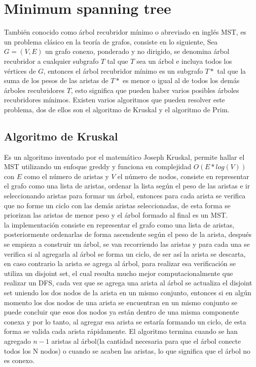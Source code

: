 \documentclass[12pt, a4paper]{article}
\newcommand\cppfile[2][]{

}
\begin{document}
	\section{Minimum spanning tree}
	\label{grafos:MST}
	
	También conocido como árbol recubridor mínimo o abreviado en inglés MST, es un problema clásico en la teoría de 
	grafos, consiste en lo siguiente, Sea $G = (V, E)$ un grafo conexo, ponderado y no dirigido, se denomina árbol 
	recubridor a cualquier subgrafo $T$ tal que $T$ sea un árbol e incluya todos los vértices de $G$, entonces el 
	árbol recubridor mínimo es un subgrafo $T*$ tal que la suma de los pesos de las aristas de $T*$ es menor o igual 
	al de todos los demás árboles recubridores $T$, esto significa que pueden haber varios posibles árboles 
	recubridores mínimos. Existen varios algoritmos que pueden resolver este problema, dos de ellos son el algoritmo 
	de Kruskal y el algoritmo de Prim.
	
	\subsection{Algoritmo de Kruskal}
	\label{grafos:MST:kruskal}
	
	Es un algoritmo inventado por el matemático Joseph Kruskal, permite hallar el MST utilizando un enfoque greddy y 
	funciona en complejidad $O(E*log(V))$ con $E$ como el número de aristas y $V$ el número de nodos, consiste en 
	representar el grafo como una lista de aristas, ordenar la lista según el peso de las aristas e ir seleccionando 
	aristas para formar un árbol, entonces para cada arista se verifica que no forme un ciclo con las demás aristas 
	seleccionadas, de esta forma se priorizan las aristas de menor peso y el árbol formado al final es un MST.\\
	
	la implementación consiste en representar el grafo como una lista de aristas, posteriormente ordenarlas de forma 
	ascendente según el peso de la arista, después se empieza a construir un árbol, se van recorriendo las aristas y 
	para cada una se verifica si al agregarla al árbol se forma un ciclo, de ser así la arista se descarta, en caso 
	contrario la arista se agrega al árbol, para realizar esa verificación se utiliza un disjoint set, el cual resulta 
	mucho mejor computacionalmente que realizar un DFS, cada vez que se agrega una arista al árbol se actualiza el 
	disjoint set uniendo los dos nodos de la arista en un mismo conjunto, entonces si en algún momento los dos nodos de
	una arista se encuentran en un mismo conjunto se puede concluir que esos dos nodos ya están dentro de una misma 
	componente conexa y por lo tanto, al agregar esa arista se estaría formando un ciclo, de esta forma se valida cada 
	arista rápidamente. El algoritmo termina cuando se han agregado $n-1$ aristas al árbol(la cantidad necesaria para 
	que el árbol conecte todos los N nodos) o cuando se acaben las aristas, lo que significa que el árbol no es conexo.
	\cppfile[24-43]{Grafos/codigos/kruskal.cpp}
	

	
\end{document}
